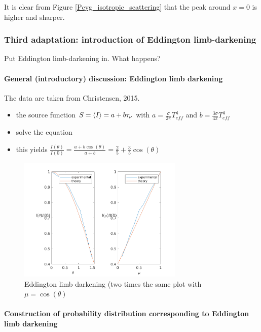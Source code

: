 \documentclass[../main/main.tex]{subfiles}
\begin{document}
It is clear from Figure \ref{Pcyg_isotropic_scattering} that the peak around $x=0$ is higher and sharper. \\
\noindent{}

\newpage
\subsubsection{Third adaptation: introduction of Eddington limb-darkening}
\label{Eddington_limb_darkening_adaptation}
Put Eddington limb-darkening in. What happens? 

\paragraph{General (introductory) discussion: Eddington limb darkening}
The data are taken from Christensen, 2015.
\begin{itemize}
\item the source function $S= \braket{I} = a + b\tau_{\nu}$ with $a= \frac{\sigma}{2 \pi}T_{eff}^4$ and $b = \frac{3 \sigma}{4 \pi}T_{eff}^4$
\item solve the equation
\item this yields $\frac{I(\theta)}{I(0)} = \frac{a+b\cos(\theta)}{a+b} = \frac{2}{5} + \frac{3}{5}\cos(\theta)$
\end{itemize}

\begin{figure}[!htp]
\centering
\includegraphics[width=0.7\textwidth]{../../introductory_exercises/P_Cygni_profile_UV_resonance/data/Eddington_limb_darkening.png}
\caption{Eddington limb darkening (two times the same plot with $\mu =  \cos(\theta)$ }
\end{figure}

\paragraph{Construction of probability distribution corresponding to Eddington limb darkening}
\end{document}
